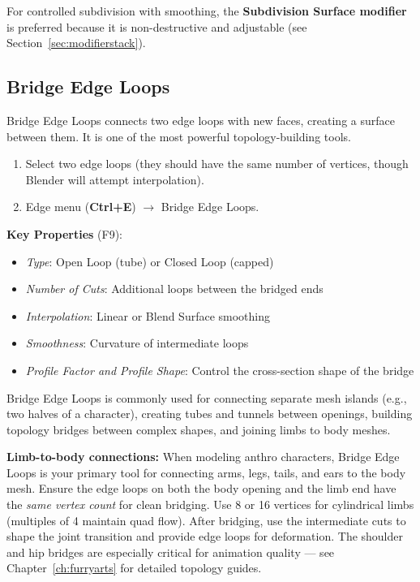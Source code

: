 For controlled subdivision with smoothing, the \textbf{Subdivision Surface modifier} is preferred because it is non-destructive and adjustable (see Section~\ref{sec:modifierstack}).

\subsection{Bridge Edge Loops}
\label{sec:bridge}

Bridge Edge Loops connects two edge loops with new faces, creating a surface between them. It is one of the most powerful topology-building tools.

\begin{enumerate}[leftmargin=2em]
  \item Select two edge loops (they should have the same number of vertices, though Blender will attempt interpolation).
  \item Edge menu (\textbf{Ctrl+E}) $\rightarrow$ Bridge Edge Loops.
\end{enumerate}

\textbf{Key Properties} (F9):
\begin{itemize}[leftmargin=2em]
  \item \textit{Type}: Open Loop (tube) or Closed Loop (capped)
  \item \textit{Number of Cuts}: Additional loops between the bridged ends
  \item \textit{Interpolation}: Linear or Blend Surface smoothing
  \item \textit{Smoothness}: Curvature of intermediate loops
  \item \textit{Profile Factor and Profile Shape}: Control the cross-section shape of the bridge
\end{itemize}

Bridge Edge Loops is commonly used for connecting separate mesh islands (e.g., two halves of a character), creating tubes and tunnels between openings, building topology bridges between complex shapes, and joining limbs to body meshes.

\begin{furrybox}
\textbf{Limb-to-body connections:} When modeling anthro characters, Bridge Edge Loops is your primary tool for connecting arms, legs, tails, and ears to the body mesh. Ensure the edge loops on both the body opening and the limb end have the \textit{same vertex count} for clean bridging. Use 8 or 16 vertices for cylindrical limbs (multiples of 4 maintain quad flow). After bridging, use the intermediate cuts to shape the joint transition and provide edge loops for deformation. The shoulder and hip bridges are especially critical for animation quality --- see Chapter~\ref{ch:furryarts} for detailed topology guides.
\end{furrybox}

